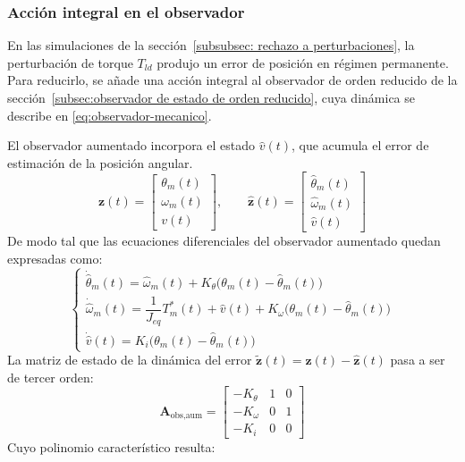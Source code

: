 \documentclass[blue,fullpaper]{ludusofficial}  %
\begin{document}
\subsubsection{Acción integral en el observador}
\begingroup
\raggedbottom
En las simulaciones de la sección~\ref{subsubsec: rechazo a perturbaciones}, la perturbación de torque $T_{ld}$ produjo un error de posición en régimen permanente. Para reducirlo, se añade una acción integral al observador de orden reducido de la sección~\ref{subsec:observador de estado de orden reducido}, cuya dinámica se describe en \eqref{eq:observador-mecanico}.

El observador aumentado incorpora el estado $\hat{v}(t)$, que acumula el error de estimación de la posición angular.
\begin{equation}
\mathbf{z}(t) = \begin{bmatrix} \theta_m(t) \\ \omega_m(t) \\ v(t) \end{bmatrix}, \qquad
\hat{\mathbf{z}}(t) = \begin{bmatrix} \hat{\theta}_m(t) \\ \hat{\omega}_m(t) \\ \hat{v}(t) \end{bmatrix}
\end{equation}
De modo tal que las ecuaciones diferenciales del observador aumentado quedan expresadas como:
\begin{equation}
\begin{cases}
\dot{\hat{\theta}}_m(t) = \hat{\omega}_m(t) + K_{\theta}\big(\theta_m(t) - \hat{\theta}_m(t)\big) \\
\dot{\hat{\omega}}_m(t) = \dfrac{1}{J_{eq}}T_m^*(t) + \hat{v}(t) + K_{\omega}\big(\theta_m(t) - \hat{\theta}_m(t)\big) \\
\dot{\hat{v}}(t) = K_{i}\big(\theta_m(t) - \hat{\theta}_m(t)\big)
\end{cases}
\end{equation}
La matriz de estado de la dinámica del error $\tilde{\mathbf{z}}(t) = \mathbf{z}(t) - \hat{\mathbf{z}}(t)$ pasa a ser de tercer orden:
\begin{equation}
\mathbf{A}_{\text{obs,aum}} = \begin{bmatrix} -K_{\theta} & 1 & 0 \\ -K_{\omega} & 0 & 1 \\ -K_{i} & 0 & 0 \end{bmatrix}
\end{equation}
Cuyo polinomio característico resulta:
\end{document}
